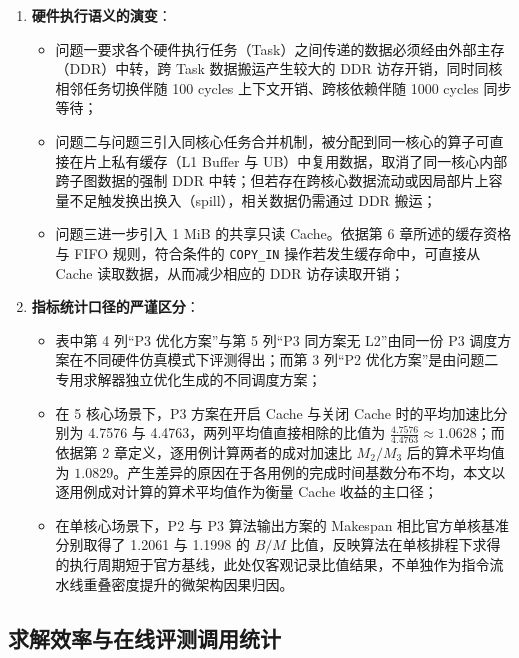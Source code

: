 \documentclass[anonymous,withtoc]{gmcm2026}
\providecommand{\tightlist}{\setlength{\itemsep}{0pt}\setlength{\parskip}{0pt}}
\begin{document}
\begin{enumerate}
\def\labelenumi{\arabic{enumi}.}
\tightlist
\item
  \textbf{硬件执行语义的演变}：

  \begin{itemize}
  \tightlist
  \item
    问题一要求各个硬件执行任务（Task）之间传递的数据必须经由外部主存（DDR）中转，跨 Task 数据搬运产生较大的 DDR 访存开销，同时同核相邻任务切换伴随 100 cycles 上下文开销、跨核依赖伴随 1000 cycles 同步等待；
  \item
    问题二与问题三引入同核心任务合并机制，被分配到同一核心的算子可直接在片上私有缓存（L1 Buffer 与 UB）中复用数据，取消了同一核心内部跨子图数据的强制 DDR 中转；但若存在跨核心数据流动或因局部片上容量不足触发换出换入（spill），相关数据仍需通过 DDR 搬运；
  \item
    问题三进一步引入 1 MiB 的共享只读 Cache。依据第 6 章所述的缓存资格与 FIFO 规则，符合条件的 \texttt{COPY\_IN} 操作若发生缓存命中，可直接从 Cache 读取数据，从而减少相应的 DDR 访存读取开销；
  \end{itemize}
\item
  \textbf{指标统计口径的严谨区分}：

  \begin{itemize}
  \tightlist
  \item
    表中第 4 列``P3 优化方案''与第 5 列``P3 同方案无 L2''由同一份 P3 调度方案在不同硬件仿真模式下评测得出；而第 3 列``P2 优化方案''是由问题二专用求解器独立优化生成的不同调度方案；
  \item
    在 5 核心场景下，P3 方案在开启 Cache 与关闭 Cache 时的平均加速比分别为 4.7576 与 4.4763，两列平均值直接相除的比值为 \(\frac{4.7576}{4.4763} \approx 1.0628\)；而依据第 2 章定义，逐用例计算两者的成对加速比 \(M_2/M_3\) 后的算术平均值为 \(1.0829\)。产生差异的原因在于各用例的完成时间基数分布不均，本文以逐用例成对计算的算术平均值作为衡量 Cache 收益的主口径；
  \item
    在单核心场景下，P2 与 P3 算法输出方案的 Makespan 相比官方单核基准分别取得了 1.2061 与 1.1998 的 \(B/M\) 比值，反映算法在单核排程下求得的执行周期短于官方基线，此处仅客观记录比值结果，不单独作为指令流水线重叠密度提升的微架构因果归因。
  \end{itemize}
\end{enumerate}

\subsection{求解效率与在线评测调用统计}
\end{document}
